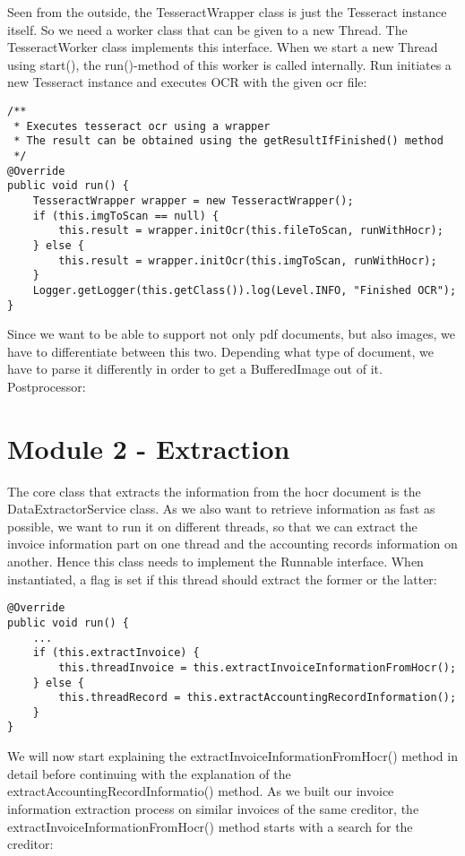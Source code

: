 Seen from the outside, the TesseractWrapper class is just the Tesseract instance itself. So we need a worker class that can be given to a new Thread. The TesseractWorker class implements this interface. When we start a new Thread using start(), the run()-method of this worker is called internally. Run initiates a new Tesseract instance and executes OCR with the given ocr file: 

\begin{lstlisting}
/**
 * Executes tesseract ocr using a wrapper
 * The result can be obtained using the getResultIfFinished() method
 */
@Override
public void run() {
    TesseractWrapper wrapper = new TesseractWrapper();
    if (this.imgToScan == null) {
        this.result = wrapper.initOcr(this.fileToScan, runWithHocr);
    } else {
        this.result = wrapper.initOcr(this.imgToScan, runWithHocr);
    }
    Logger.getLogger(this.getClass()).log(Level.INFO, "Finished OCR");
}
\end{lstlisting}

Since we want to be able to support not only pdf documents, but also images, we have to differentiate between this two. Depending what type of document, we have to parse it differently in order to get a BufferedImage out of it.
Postprocessor: %

\section{Module 2 - Extraction}

The core class that extracts the information from the hocr document is the DataExtractorService class. As we also want to retrieve information as fast as possible, we want to run it on different threads, so that we can extract the invoice information part on one thread and the accounting records information on another. Hence this class needs to implement the Runnable interface. When instantiated, a flag is set if this thread should extract the former or the latter:

\begin{lstlisting}
@Override
public void run() {
    ...
    if (this.extractInvoice) {
        this.threadInvoice = this.extractInvoiceInformationFromHocr();
    } else {
        this.threadRecord = this.extractAccountingRecordInformation();
    }
}
\end{lstlisting}

We will now start explaining the extractInvoiceInformationFromHocr() method in detail before continuing with the explanation of the extractAccountingRecordInformatio() method.
As we built our invoice information extraction process on similar invoices of the same creditor, the extractInvoiceInformationFromHocr() method starts with a search for the creditor:

